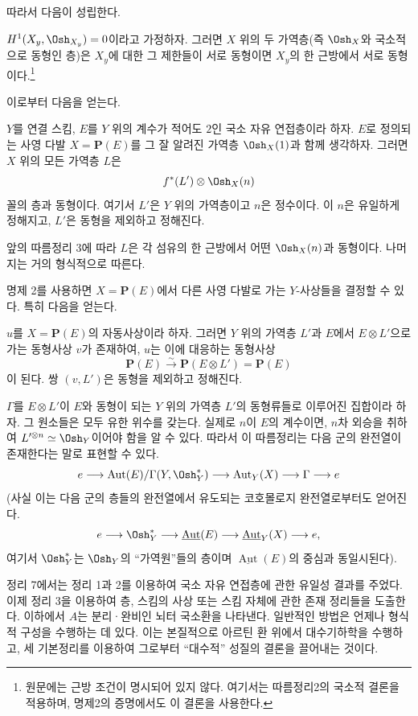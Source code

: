 따라서 다음이 성립한다.

 $H^1(X_y,\Osh_{X_y})=0$이라고 가정하자. 그러면
$X$ 위의 두 가역층(즉 $\Osh_X$와 국소적으로 동형인 층)은 $X_y$에 대한
그 제한들이 서로 동형이면 $X_y$의 한 근방에서 서로 동형이다.\footnote{원문에는 근방 조건이 명시되어 있지 않다. 여기서는 따름정리2의 국소적 결론을 적용하며, 명제2의 증명에서도 이 결론을 사용한다.}

이로부터 다음을 얻는다.

 $Y$를 연결 스킴, $E$를 $Y$ 위의 계수가 적어도 $2$인
국소 자유 연접층이라 하자. $E$로 정의되는 사영 다발
$X=\mathbf P(E)$를 그 잘 알려진 가역층 $\Osh_X(1)$과 함께 생각하자.
그러면 $X$ 위의 모든 가역층 $L$은
\[
  f^*(L')\otimes\Osh_X(n)
\]
꼴의 층과 동형이다. 여기서 $L'$은 $Y$ 위의 가역층이고 $n$은 정수이다.
이 $n$은 유일하게 정해지고, $L'$은 동형을 제외하고 정해진다.

앞의 따름정리 3에 따라 $L$은 각 섬유의 한 근방에서 어떤
$\Osh_X(n)$과 동형이다. 나머지는 거의 형식적으로 따른다.

명제 2를 사용하면 $X=\mathbf P(E)$에서 다른 사영 다발로 가는
$Y$-사상들을 결정할 수 있다. 특히 다음을 얻는다.

 $u$를 $X=\mathbf P(E)$의 자동사상이라 하자. 그러면
$Y$ 위의 가역층 $L'$과 $E$에서 $E\otimes L'$으로 가는 동형사상 $v$가
존재하여, $u$는 이에 대응하는 동형사상
\[
  \mathbf P(E)\xrightarrow{\sim}\mathbf P(E\otimes L')=\mathbf P(E)
\]
이 된다. 쌍 $(v,L')$은 동형을 제외하고 정해진다.

$\Gamma$를 $E\otimes L'$이 $E$와 동형이 되는 $Y$ 위의 가역층 $L'$의
동형류들로 이루어진 집합이라 하자. 그 원소들은 모두 유한 위수를 갖는다.
실제로 $n$이 $E$의 계수이면, $n$차 외승을 취하여
$L'^{\otimes n}\simeq\Osh_Y$이어야 함을 알 수 있다. 따라서 이
따름정리는 다음 군의 완전열이 존재한다는 말로 표현할 수 있다.
\[
  e\longrightarrow
  \operatorname{Aut}(E)/\Gamma(Y,\Osh_Y^*)
  \longrightarrow \operatorname{Aut}_Y(X)
  \longrightarrow \Gamma\longrightarrow e
\]
(사실 이는 다음 군의 층들의 완전열에서 유도되는 코호몰로지 완전열로부터도
얻어진다.
\[
  e\longrightarrow \Osh_Y^*
  \longrightarrow \underline{\operatorname{Aut}}(E)
  \longrightarrow \underline{\operatorname{Aut}}_Y(X)
  \longrightarrow e,
\]
여기서 $\Osh_Y^*$는 $\Osh_Y$의 ``가역원''들의 층이며
$\underline{\operatorname{Aut}}(E)$의 중심과 동일시된다).


정리 7에서는 정리 1과 2를 이용하여 국소 자유 연접층에 관한 유일성 결과를
주었다. 이제 정리 3을 이용하여 층, 스킴의 사상 또는 스킴 자체에 관한 존재
정리들을 도출한다. 이하에서 $A$는 분리·완비인 뇌터 국소환을 나타낸다.
일반적인 방법은 언제나 형식적 구성을 수행하는 데 있다. 이는 본질적으로
아르틴 환 위에서 대수기하학을 수행하고, 세 기본정리를 이용하여 그로부터
``대수적'' 성질의 결론을 끌어내는 것이다.

